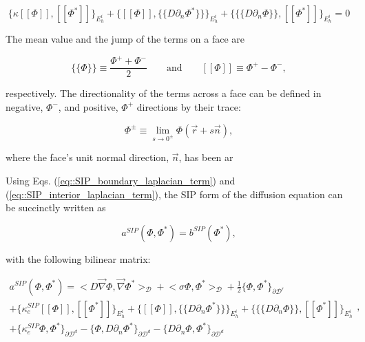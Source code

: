 \begin{equation}
\label{eq::SIP_interior_laplacian_term}
\Big\{ \kappa [\![   \Phi ]\!] , [\![  \Phi^* ]\!]\Big\}_{E_h^i} + \Big\{  [\![   \Phi ]\!] , \{\!\{  D \partial_n \Phi^* \}\!\}\Big\}_{E_h^i} + \Big\{ \{\!\{  D \partial_n  \Phi \}\!\} , [\![  \Phi^* ]\!]\Big\}_{E_h^i} = 0
\end{equation}

The mean value and the jump of the terms on a face are

\begin{equation}
\label{eq::solution_mean_and_jump}
\{\!\{  \Phi \}\!\} \equiv \frac{\Phi^+ + \Phi^-}{2} \qquad \text{and} \qquad [\![   \Phi ]\!] \equiv \Phi^+ - \Phi^- ,
\end{equation}

\noindent respectively. The directionality of the terms across a face can be defined in negative, $\Phi^-$, and positive, $\Phi^+$ directions by their trace:

\begin{equation}
\label{eq::solution_trace}
\Phi^{\pm} \equiv \lim_{s \rightarrow 0^{\pm}} \Phi (\vec{r} + s \vec{n}),
\end{equation}

\noindent where the face's unit normal direction, $\vec{n}$, has been ar

Using Eqs. (\ref{eq::SIP_boundary_laplacian_term}) and (\ref{eq::SIP_interior_laplacian_term}), the SIP form of the diffusion equation can be succinctly written as

\begin{equation}
a^{SIP}( \Phi, \Phi^*) = b^{SIP}(\Phi^*),
\label{eq::SIP_weak_form}
\end{equation}

\noindent with the following bilinear matrix:

\begin{equation}
\label{eq::SIP_bilinear_form}
\begin{aligned}
a^{SIP}( \Phi, \Phi^*)  = \Big<  D \vec{\nabla}  \Phi , \vec{\nabla} \Phi^*  \Big>_{\mathcal{D}} + \Big<  \sigma   \Phi ,  \Phi^*  \Big>_{\mathcal{D}}  +  \frac{1}{2} \Big\{    \Phi , \Phi^* \Big\}_{\partial \mathcal{D}^r}   \\
+  \Big\{ \kappa_e^{SIP} [\![   \Phi ]\!] , [\![  \Phi^* ]\!]\Big\}_{E_h^i} + \Big\{  [\![   \Phi ]\!] , \{\!\{  D \partial_n \Phi^* \}\!\}\Big\}_{E_h^i}  + \Big\{ \{\!\{  D \partial_n  \Phi \}\!\} , [\![ \Phi^* ]\!]\Big\}_{E_h^i} \\
+ \Big\{ \kappa_e^{SIP}   \Phi ,   \Phi^* \Big\}_{\partial \mathcal{D}^d} - \Big\{   \Phi  ,  D \partial_n \Phi^* \Big\}_{\partial \mathcal{D}^d} - \Big\{   D 				\partial_n  \Phi , \Phi^* \Big\}_{\partial \mathcal{D}^d}  
\end{aligned} ,
\end{equation}

